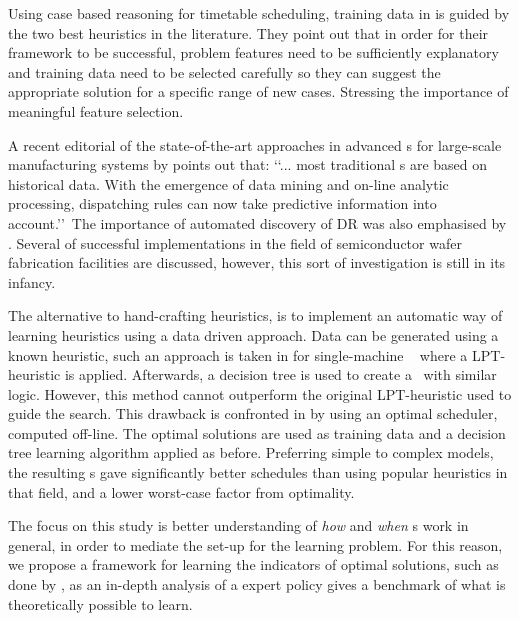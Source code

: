 \documentclass[smallextended]{svjour3}
\begin{document}

Using case based reasoning for timetable scheduling, training data in 
\cite{Burke06} is guided by the two best heuristics in the literature.
They point out that in order for their framework to be successful, problem 
features need to be sufficiently explanatory and training data need to be 
selected carefully so they can suggest the appropriate solution for a specific 
range of new cases. Stressing the importance of meaningful feature selection. 


A recent editorial of the state-of-the-art approaches in advanced \dr s for 
large-scale manufacturing systems by \cite{Chen13} points out that:
\lq\lq ... most traditional \dr s are based on historical data. 
With the emergence of data mining and on-line analytic processing, dispatching 
rules can now take predictive information into account.\rq\rq~The importance of 
automated discovery of DR was also emphasised by \cite{Monch13}. 
Several of successful implementations in the field of semiconductor wafer 
fabrication facilities are discussed, however, this sort of investigation is 
still in its infancy.

The alternative to hand-crafting heuristics, is to implement an automatic way 
of learning heuristics using a data driven approach. 
Data can be generated using a known heuristic, such an approach is taken in 
\cite{Siggi05} for single-machine \jsp\ %
where a LPT-heuristic is applied.
Afterwards, a decision tree is used to create a \dr\ with similar logic. 
However, this method cannot outperform the original 
LPT-heuristic used to guide the search. 
This drawback is confronted in \cite{Malik08,Russell09,Siggi10} by using an 
optimal scheduler, computed off-line. 
The optimal solutions are used as training data and a decision tree 
learning algorithm applied as before. Preferring simple to complex models, the 
resulting \dr s gave significantly better schedules than using popular 
heuristics in that field, and a lower worst-case factor from optimality. 

The focus on this study is better understanding of \emph{how} and \emph{when} 
\dr s work in general, in order to mediate the set-up for the 
learning problem.
For this reason, we propose a framework for learning the indicators of optimal 
solutions, such as done by \cite{Siggi10}, as an in-depth analysis of a expert 
policy gives a benchmark of what is theoretically possible to learn. 
\end{document}
